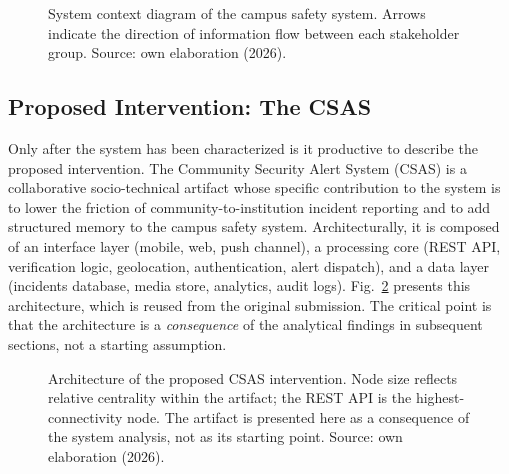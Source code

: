 \documentclass[conference]{IEEEtran}
\begin{document}
\begin{figure}[h]
\centering
{}
\caption{System context diagram of the campus safety system.
Arrows indicate the direction of information flow between each
stakeholder group. Source: own elaboration (2026).}
\label{fig:context}
\end{figure}

\subsection{Proposed Intervention: The CSAS}
Only after the system has been characterized is it productive to
describe the proposed intervention. The Community Security Alert
System (CSAS) is a collaborative socio-technical artifact whose
specific contribution to the system is to lower the friction of
community-to-institution incident reporting and to add structured
memory to the campus safety system. Architecturally, it is composed
of an interface layer (mobile, web, push channel), a processing core
(REST API, verification logic, geolocation, authentication, alert
dispatch), and a data layer (incidents database, media store,
analytics, audit logs). Fig.~\ref{fig:architecture} presents this
architecture, which is reused from the original submission. The
critical point is that the architecture is a \emph{consequence} of
the analytical findings in subsequent sections, not a starting
assumption.

\begin{figure}[h]
\centering
{}
\caption{Architecture of the proposed CSAS intervention. Node size
reflects relative centrality within the artifact; the REST API is the
highest-connectivity node. The artifact is presented here as a
consequence of the system analysis, not as its starting point.
Source: own elaboration (2026).}
\label{fig:architecture}
\end{figure}

\end{document}
